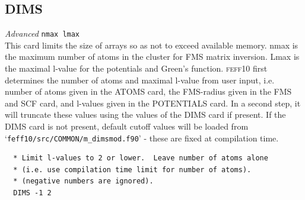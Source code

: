 \documentclass[11pt,oneside]{report} %
\newcommand{\feffcurrent}{\textsc{feff10}}
\newenvironment{Card}[4]%
      {\vspace{3ex}%
        \subsection{#1}
        \quad\textsl{#3}\newline
        \quad\texttt{#2}\newline%
        \label{card:#4}\\}
      {}
\newcommand{\file}[1]{`\texttt{#1}'}
\begin{document}
\begin{Card}{DIMS}{nmax lmax}{Advanced}{dim}
  This card limits the size of arrays so as not to exceed available memory.  nmax is the maximum number of atoms in the cluster
  for FMS matrix inversion.  Lmax is the maximal l-value for the potentials and Green's function.
  {\feffcurrent} first determines the number of atoms and maximal l-value from user input, i.e. number of atoms given in the ATOMS card,
  the FMS-radius given in the FMS and SCF card, and l-values given in the POTENTIALS card.  In a second step, it will truncate these values using the values of the DIMS card if present.  If the DIMS card is not present, default cutoff values will be loaded from 
  \file{feff10/src/COMMON/m\_dimsmod.f90} - these are fixed at compilation time.
\begin{verbatim}
  * Limit l-values to 2 or lower.  Leave number of atoms alone 
  * (i.e. use compilation time limit for number of atoms).
  * (negative numbers are ignored).
  DIMS -1 2
\end{verbatim}
\end{Card}  
\end{document}
